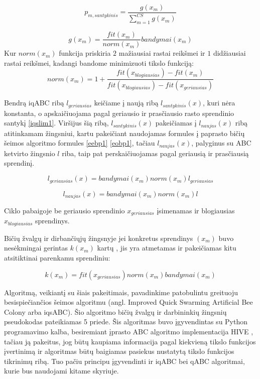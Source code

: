 \documentclass{VUMIFPSmagistrinis}
\begin{document}
\begin{equation}\label{iqsobp}
p_{m, santykinis}=\frac{g(x_m)}{\sum_{m=1}^{CS}{g(x_m)}}
\end{equation}

\begin{equation}\label{iqsobp2}
g(x_m)=\frac{fit(x_{m})}{norm(x_{m})}bandymai(x_{m})
\end{equation}
Kur $norm(x_{m})$ funkcija priskiria $2$ mažiausiai rastai reikšmei ir $1$ didžiausiai rastai reikšmei, kadangi bandome minimizuoti tikslo funkciją:
\begin{equation}\label{iqsobp3}
        norm(x_{m}) = 1 + \frac{fit(x_{blogiausias})-fit(x_{m})}{fit(x_{blogiausias})-fit(x_{geriausias})}
\end{equation}

Bendrą iqABC ribą $l_{geriausias}$ keičiame į naują ribą $l_{santykinis}(x)$, kuri nėra konstanta, o apskaičiuojama pagal geriausio ir prasčiausio rasto sprendinio santykį \eqref{iqslim1}. Viršijus šią ribą, $l_{santykinis}(x)$ pakeičiamas į $l_{naujas}(x)$ ribą atitinkamam žingsniui, kartu pakeičiant naudojamas formules į paprasto bičių šeimos algoritmo formules \eqref{eebp1} \eqref{eobp1}, tačiau $l_{naujas}(x)$, palyginus su ABC ketvirto žingsnio $l$ riba, taip pat perskaičiuojamas pagal geriausią ir prasčiausią sprendinį. 

\begin{equation}\label{iqslim1}
        l_{geriausias}(x)=bandymai(x_{m})norm(x_{m})l_{geriausias}
\end{equation}

\begin{equation}\label{iqslim2}
        l_{naujas}(x)=bandymai(x_{m})norm(x_{m})l
\end{equation}

Ciklo pabaigoje be geriausio sprendinio  $x_{geriausias}$ įsimenamas ir blogiausias $x_{blogiausias}$ sprendinys.





Bičių žvalgų ir dirbančiųjų žingsnyje jei konkretus sprendinys $(x_m)$ buvo nesėkmingai gerintas $k(x_m)$ kartų , jis yra atmetamas ir pakeičiamas kitu atsitiktinai parenkamu sprendiniu:

\begin{equation}\label{iqssp}
k(x_m) = fit(x_{geriausias})norm(x_{m}){bandymai(x_m)}
\end{equation}


Algoritmą, veikiantį su šiais pakeitimais, pavadinkime patobulintu greituoju besispiečiančios šeimos algoritmu (angl. Improved Quick Swarming Artificial Bee Colony arba iqsABC). Šio algoritmo bičių žvalgų ir darbininkių žingsnių pseudokodas pateikiamas 5 priede.
Šis algoritmas buvo įgyvendintas su Python programavimo kalba, besiremiant įprasto ABC algoritmo implementacija HIVE \cite{Wui17}, tačiau ją pakeitus, jog būtų kaupiama informacija pagal kiekvieną tikslo funkcijos įvertinimą ir algoritmas būtų baigiamas pasiekus nustatytą tikslo funkcijos tikrinimų ribą. Tuo pačiu principu įgyvendinti ir iqABC bei qABC algoritmai, kurie bus naudojami kitame skyriuje.
\end{document}
